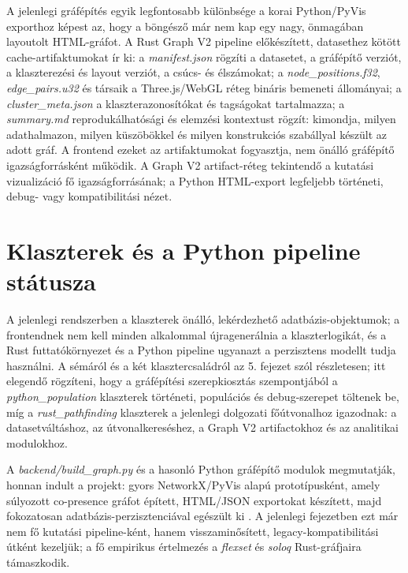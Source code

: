 A jelenlegi gráfépítés egyik legfontosabb különbsége a korai Python/PyVis exporthoz képest az, hogy a böngésző már nem kap egy nagy, önmagában layoutolt HTML-gráfot. A Rust Graph V2 pipeline előkészített, datasethez kötött cache-artifaktumokat ír ki: a \textit{manifest.json} rögzíti a datasetet, a gráfépítő verziót, a klaszterezési és layout verziót, a csúcs- és élszámokat; a \textit{node\_positions.f32}, \textit{edge\_pairs.u32} és társaik a Three.js/WebGL réteg bináris bemeneti állományai; a \textit{cluster\_meta.json} a klaszterazonosítókat és tagságokat tartalmazza; a \textit{summary.md} reprodukálhatósági és elemzési kontextust rögzít: kimondja, milyen adathalmazon, milyen küszöbökkel és milyen konstrukciós szabállyal készült az adott gráf. A frontend ezeket az artifaktumokat fogyasztja, nem önálló gráfépítő igazságforrásként működik. A Graph V2 artifact-réteg tekintendő a kutatási vizualizáció fő igazságforrásának; a Python HTML-export legfeljebb történeti, debug- vagy kompatibilitási nézet.

\section{Klaszterek és a Python pipeline státusza}

A jelenlegi rendszerben a klaszterek önálló, lekérdezhető adatbázis-objektumok; a frontendnek nem kell minden alkalommal újragenerálnia a klaszterlogikát, és a Rust futtatókörnyezet és a Python pipeline ugyanazt a perzisztens modellt tudja használni. A sémáról és a két klasztercsaládról az 5. fejezet szól részletesen; itt elegendő rögzíteni, hogy a gráfépítési szerepkiosztás szempontjából a \textit{python\_population} klaszterek történeti, populációs és debug-szerepet töltenek be, míg a \textit{rust\_pathfinding} klaszterek a jelenlegi dolgozati főútvonalhoz igazodnak: a datasetváltáshoz, az útvonalkereséshez, a Graph V2 artifactokhoz és az analitikai modulokhoz.


A \textit{backend/build\_graph.py} és a hasonló Python gráfépítő modulok megmutatják, honnan indult a projekt: gyors NetworkX/PyVis alapú prototípusként, amely súlyozott co-presence gráfot épített, HTML/JSON exportokat készített, majd fokozatosan adatbázis-perzisztenciával egészült ki \cite{networkx_greedy,pyvis}. A jelenlegi fejezetben ezt már nem fő kutatási pipeline-ként, hanem visszaminősített, legacy-kompatibilitási útként kezeljük; a fő empirikus értelmezés a \textit{flexset} és \textit{soloq} Rust-gráfjaira támaszkodik.

